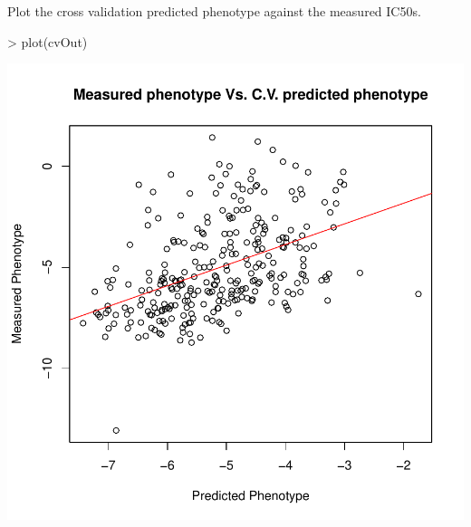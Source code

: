 \documentclass[a4paper]{article}
\begin{document}
Plot the cross validation predicted phenotype against the measured IC50s.
\begin{Schunk}
\begin{Sinput}
> plot(cvOut)
\end{Sinput}
\end{Schunk}
\includegraphics{vignetteOutline-005}
\end{document}
